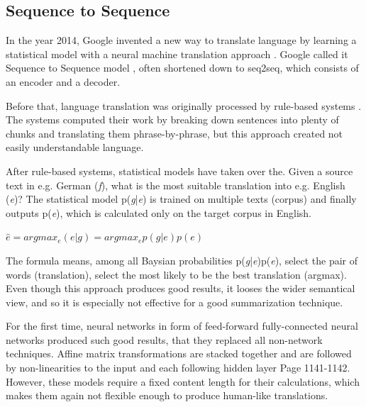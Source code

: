 \subsection{Sequence to Sequence}\label{ss:seq2seq}
In the year 2014, Google invented a new way to translate language by learning a statistical model with a neural machine translation approach \cite{seq2seq}. Google called it Sequence to Sequence model \cite{seq2seq}, often shortened down to seq2seq, which consists of an encoder and a decoder. 

Before that, language translation was originally processed by rule-based systems \cite{chen-goodman}. The systems computed their work by breaking down sentences into plenty of chunks and translating them phrase-by-phrase, but this approach created not easily understandable language.

After rule-based systems, statistical models have taken over the. Given a source text in e.g. German (\textit{f}), what is the most suitable translation into e.g. English (\textit{e})? The statistical model p(\textit{g}|\textit{e}) is trained on multiple texts (corpus) and finally outputs p(\textit{e}), which is calculated only on the target corpus in English. 

\begin{center}
\begin{math}
\hat{e} = argmax_{e}(e|g) = argmax_{e} p(g|e) p(e)
\label{eq:rule}
\end{math}
\end{center}

The formula means, among all Baysian probabilities p(\textit{g}|\textit{e})p(\textit{e}), select the pair of words (translation), select the most likely to be the best translation (argmax). Even though this approach produces good results, it looses the wider semantical view, and so it is especially not effective for a good summarization technique.

For the first time, neural networks in form of feed-forward fully-connected neural networks produced such good results, that they replaced all non-network techniques. Affine matrix transformations are stacked together and are followed by non-linearities to the input and each following hidden layer \cite{Bengio} Page 1141-1142. However, these models require a fixed content length for their calculations, which makes them again not flexible enough to produce human-like translations. 

